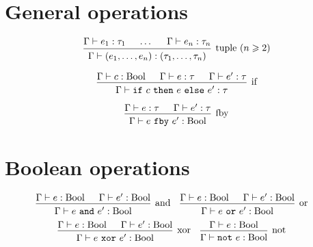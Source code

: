 \documentclass[english, 12pt]{article}
\DeclareMathOperator{\Bool}{Bool}
\newcommand{\UnOp}[2]{\ensuremath{\texttt{#1}~#2}}
\newcommand{\BinOp}[3]{\ensuremath{#2~\texttt{#1}~#3}}
\newcommand{\IfExpr}[3]{\ensuremath{\texttt{if}~#1~\texttt{then}~#2~\texttt{else}~#3}}
\begin{document}
\section{General operations}

\[
    \begin{prooftree}
        \hypo{\Gamma \vdash e_1 : \tau_1}
        \hypo{\dots}
        \hypo{\Gamma \vdash e_n : \tau_n}
        \infer3[tuple $(n\geqslant2)$]{\Gamma \vdash (e_1, \dots, e_n) : (\tau_1, \dots, \tau_n)}
    \end{prooftree}
\]

\[
    \begin{prooftree}
        \hypo{\Gamma \vdash c : \Bool}
        \hypo{\Gamma \vdash e : \tau}
        \hypo{\Gamma \vdash e' : \tau}
        \infer3[if]{\Gamma \vdash \IfExpr{c}{e}{e'}: \tau}
    \end{prooftree}
\]

\[
    \begin{prooftree}
        \hypo{\Gamma \vdash e : \tau}
        \hypo{\Gamma \vdash e' : \tau}
        \infer2[fby]{\Gamma \vdash \BinOp{fby}{e}{e'}: \Bool}
    \end{prooftree}
\]

\section{Boolean operations}
\begin{align*}
     &
    \begin{prooftree}
        \hypo{\Gamma \vdash e : \Bool}
        \hypo{\Gamma \vdash e' : \Bool}
        \infer2[and]{\Gamma \vdash \BinOp{and}{e}{e'} : \Bool}
    \end{prooftree}
     &
     &
    \begin{prooftree}
        \hypo{\Gamma \vdash e : \Bool}
        \hypo{\Gamma \vdash e' : \Bool}
        \infer2[or]{\Gamma \vdash \BinOp{or}{e}{e'}: \Bool}
    \end{prooftree}
\end{align*}
\begin{align*}
     &
    \begin{prooftree}
        \hypo{\Gamma \vdash e : \Bool}
        \hypo{\Gamma \vdash e' : \Bool}
        \infer2[xor]{\Gamma \vdash \BinOp{xor}{e}{e'}: \Bool}
    \end{prooftree}
     &
     &
    \begin{prooftree}
        \hypo{\Gamma \vdash e : \Bool}
        \infer1[not]{\Gamma \vdash \UnOp{not}{e}: \Bool}
    \end{prooftree}
\end{align*}
\end{document}
